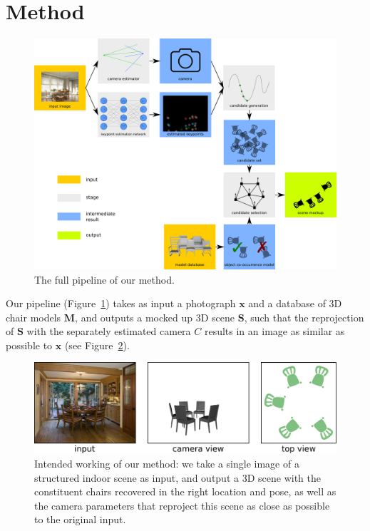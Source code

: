 \documentclass[10pt,twocolumn,letterpaper]{article}
\newcommand{\bb}[1]{{\bm{#1}}}
\begin{document}
\section{Method}
\begin{figure}[h!tb]
    \includegraphics[width=\linewidth]{figures/pipeline/pipeline}
    \caption[Pipeline]{The full pipeline of our method.}
    \label{fig:ch4:pipeline}
\end{figure}
Our pipeline (Figure~\ref{fig:ch4:pipeline}) takes as input a photograph $\bb{x}$ and a database of 3D chair models
$\bb{M}$, and outputs a mocked up 3D scene $\bb{S}$, such that the reprojection
of $\bb{S}$ with the separately estimated camera $C$ results in an image as similar as possible to $\bb{x}$ (see Figure~\ref{fig:ch4:intended_outcome}).

\begin{figure}[t]
    \includegraphics[width=\linewidth]{figures/expected_output/expected_output}
    \caption[Expected output]{Intended working of our method: we take a single image of a structured indoor scene as input, and output a 3D scene with the constituent chairs recovered in the right location and pose, as well as the camera parameters that reproject this scene as close as possible to the original input.}
    \label{fig:ch4:intended_outcome}
\end{figure}
\end{document}
